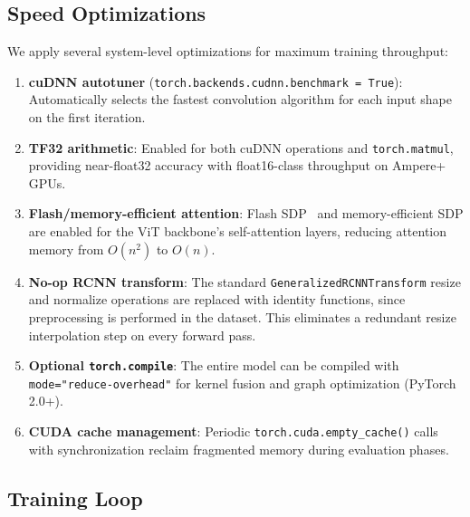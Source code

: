 \documentclass[runningheads]{llncs}
\begin{document}
\subsection{Speed Optimizations}
\label{sec:speed_optimizations}

We apply several system-level optimizations for maximum training throughput:

\begin{enumerate}
    \item \textbf{cuDNN autotuner} (\texttt{torch.backends.cudnn.benchmark = True}): Automatically selects the fastest convolution algorithm for each input shape on the first iteration.
    
    \item \textbf{TF32 arithmetic}: Enabled for both cuDNN operations and \texttt{torch.matmul}, providing near-float32 accuracy with float16-class throughput on Ampere+ GPUs.
    
    \item \textbf{Flash/memory-efficient attention}: Flash SDP~\cite{dao2022flashattention} and memory-efficient SDP are enabled for the ViT backbone's self-attention layers, reducing attention memory from $O(n^2)$ to $O(n)$.
    
    \item \textbf{No-op RCNN transform}: The standard \texttt{GeneralizedRCNNTransform} resize and normalize operations are replaced with identity functions, since preprocessing is performed in the dataset. This eliminates a redundant resize interpolation step on every forward pass.
    
    \item \textbf{Optional \texttt{torch.compile}}: The entire model can be compiled with \texttt{mode="reduce-overhead"} for kernel fusion and graph optimization (PyTorch 2.0+).
    
    \item \textbf{CUDA cache management}: Periodic \texttt{torch.cuda.empty\_cache()} calls with synchronization reclaim fragmented memory during evaluation phases.
\end{enumerate}


\subsection{Training Loop}
\label{sec:training_loop}
\end{document}
